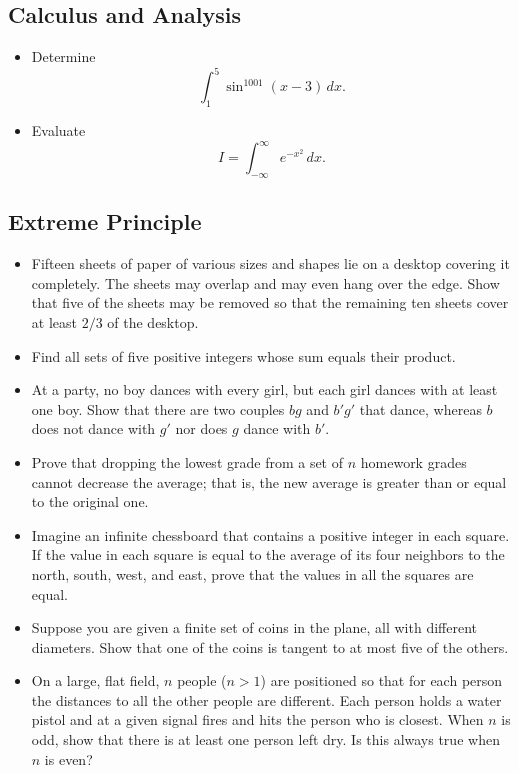\documentclass[12pt]{article}
\begin{document}
\subsection{Calculus and Analysis}
\begin{itemize}
  \item Determine
  \[
  \int_1^5 \sin^{1001}(x - 3)\, dx.
  \]

  \item Evaluate
  \[
  I = \int_{-\infty}^{\infty} e^{-x^2}\, dx.
  \]
\end{itemize}

\subsection{Extreme Principle}
\begin{itemize}
  \item Fifteen sheets of paper of various sizes and shapes lie on a desktop covering it completely. The sheets may overlap and may even hang over the edge. Show that five of the sheets may be removed so that the remaining ten sheets cover at least $2/3$ of the desktop.

  \item Find all sets of five positive integers whose sum equals their product.

  \item At a party, no boy dances with every girl, but each girl dances with at least one boy. Show that there are two couples $bg$ and $b'g'$ that dance, whereas $b$ does not dance with $g'$ nor does $g$ dance with $b'$.

  \item Prove that dropping the lowest grade from a set of $n$ homework grades cannot decrease the average; that is, the new average is greater than or equal to the original one.

  \item Imagine an infinite chessboard that contains a positive integer in each square. If the value in each square is equal to the average of its four neighbors to the north, south, west, and east, prove that the values in all the squares are equal.

  \item Suppose you are given a finite set of coins in the plane, all with different diameters. Show that one of the coins is tangent to at most five of the others.

  \item On a large, flat field, $n$ people ($n > 1$) are positioned so that for each person the distances to all the other people are different. Each person holds a water pistol and at a given signal fires and hits the person who is closest. When $n$ is odd, show that there is at least one person left dry. Is this always true when $n$ is even?


\end{itemize}
\end{document}
